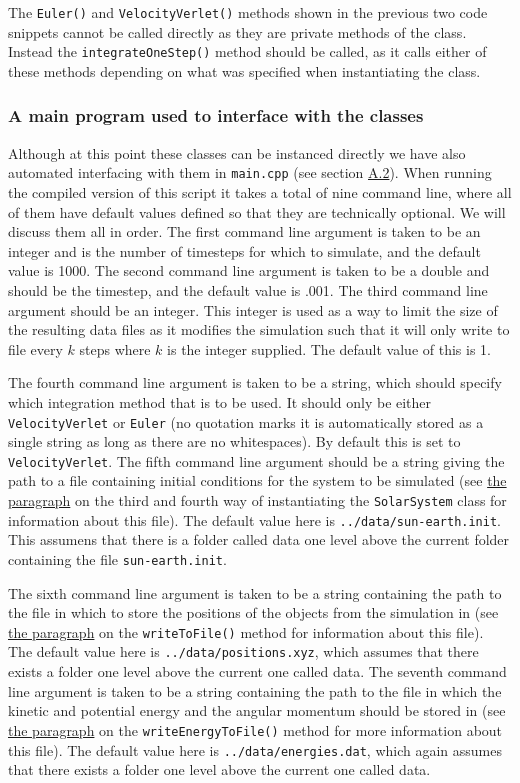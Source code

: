 \documentclass[reprint,english,notitlepage]{revtex4-1}  %
\begin{document}
The \verb+Euler()+ and \verb+VelocityVerlet()+ methods shown in the previous two code snippets cannot be called directly as they are private methods of the class. Instead the \verb+integrateOneStep()+ method should be called, as it calls either of these methods depending on what was specified when instantiating the class.


\subsubsection{A main program used to interface with the classes} \label{sec:III:a:4}

Although at this point these classes can be instanced directly we have also automated interfacing with them in \verb+main.cpp+ (see section \hyperref[A.2]{A.2}). When running the compiled version of this script it takes a total of nine command line, where all of them have default values defined so that they are technically optional. We will discuss them all in order. The first command line argument is taken to be an integer and is the number of timesteps for which to simulate, and the default value is 1000. The second command line argument is taken to be a double and should be the timestep, and the default value is .001. The third command line argument should be an integer. This integer is used as a way to limit the size of the resulting data files as it modifies the simulation such that it will only write to file every $k$ steps where $k$ is the integer supplied. The default value of this is 1. 

The fourth command line argument is taken to be a string, which should specify which integration method that is to be used. It should only be either \verb+VelocityVerlet+ or \verb+Euler+ (no quotation marks it is automatically stored as a single string as long as there are no whitespaces). By default this is set to \verb+VelocityVerlet+. The fifth command line argument should be a string giving the path to a file containing initial conditions for the system to be simulated (see \hyperref[poi:initfile]{the paragraph} on the third and fourth way of instantiating the \verb+SolarSystem+ class for information about this file). The default value here is \verb+../data/sun-earth.init+. This assumens that there is a folder called data one level above the current folder containing the file \verb+sun-earth.init+. 

The sixth command line argument is taken to be a string containing the path to the file in which to store the positions of the objects from the simulation in (see \hyperref[poi:write_to_file]{the paragraph} on the \verb+writeToFile()+ method for information about this file). The default value here is \verb+../data/positions.xyz+, which assumes that there exists a folder one level above the current one called data. The seventh command line argument is taken to be a string containing the path to the file in which the kinetic and potential energy and the angular momentum should be stored in (see \hyperref[poi:write_energy_to_file]{the paragraph} on the \verb+writeEnergyToFile()+ method for more information about this file). The default value here is \verb+../data/energies.dat+, which again assumes that there exists a folder one level above the current one called data. 
\end{document}
